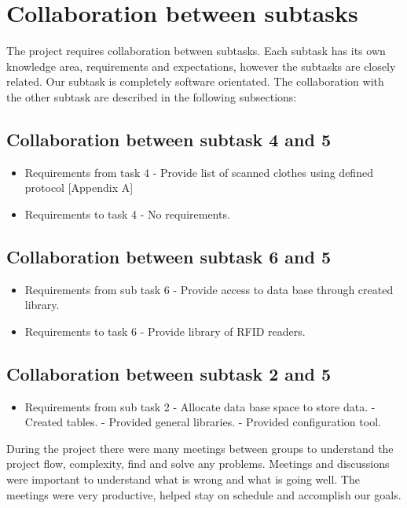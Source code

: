 %
\section{Collaboration between subtasks}

The project requires collaboration between subtasks. Each subtask has its own knowledge area, requirements and expectations, however the subtasks are closely related. Our subtask is completely software orientated. The collaboration with the other subtask are described in the following subsections:

\subsection{Collaboration between subtask 4 and 5}
\begin{itemize}
	\item Requirements from task 4
	\subitem - Provide list of scanned clothes using defined protocol [Appendix A]
	\item Requirements to task 4
	\subitem - No requirements.
\end{itemize}

\subsection{Collaboration between subtask 6 and 5}
\begin{itemize}
	\item Requirements from sub task 6
	\subitem - Provide access to data base through created library.
	\item Requirements to task 6
	\subitem - Provide library of RFID readers.
\end{itemize}

\subsection{Collaboration between subtask 2 and 5}
\begin{itemize}
	\item Requirements from sub task 2
	\subitem - Allocate data base space to store data.
	\subitem - Created tables.
	\subitem - Provided general libraries.
	\subitem - Provided configuration tool.
\end{itemize}

During the project there were many meetings between groups to understand the project flow, complexity, find and solve any problems. Meetings and discussions were important to understand what is wrong and what is going well. The meetings were very productive, helped stay on schedule and accomplish our goals.